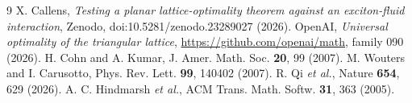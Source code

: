 \documentclass[11pt,a4paper]{article}
\begin{document}
\begin{thebibliography}{9}
 X. Callens, \emph{Testing a planar lattice-optimality theorem against an exciton-fluid interaction},
Zenodo, doi:10.5281/zenodo.23289027 (2026).
 OpenAI, \emph{Universal optimality of the triangular lattice}, \url{https://github.com/openai/math}, family 090 (2026).
 H. Cohn and A. Kumar, J. Amer. Math. Soc. \textbf{20}, 99 (2007).
 M. Wouters and I. Carusotto, Phys. Rev. Lett. \textbf{99}, 140402 (2007).
 R. Qi \emph{et al.}, Nature \textbf{654}, 629 (2026).
 A. C. Hindmarsh \emph{et al.}, ACM Trans. Math. Softw. \textbf{31}, 363 (2005).
\end{thebibliography}
\end{document}
